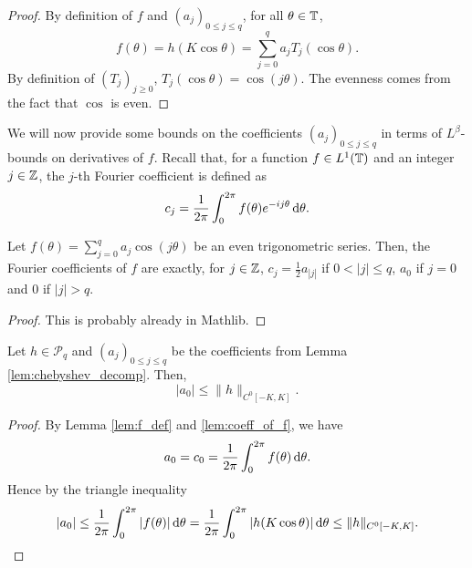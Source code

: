 \begin{proof}
  By definition of $f$ and $(a_j)_{0 \leq j \leq q}$,
  for all $\theta \in \mathbb{T}$,
  \begin{equation*}
    f(\theta) = h(K \cos \theta) = \sum_{j=0}^q a_j T_j(\cos \theta).
  \end{equation*}
  By definition of $(T_j)_{j \geq 0}$, $T_j(\cos \theta) = \cos (j \theta)$.
  The evenness comes from the fact that $\cos$ is even.
\end{proof}

We will now provide some bounds on the coefficients $(a_j)_{0 \leq j \leq q}$
in terms of $L^\beta$-bounds on derivatives of $f$.
Recall that, for a function $f \in L^1(\mathbb{T})$ and an integer $j \in \mathbb{Z}$,
the $j$-th Fourier coefficient is defined as
\begin{equation*}
  c_j = \frac{1}{2 \pi} \int_0^{2 \pi} f(\theta) e^{-i j \theta} \, \mathrm{d} \theta.
\end{equation*}

\begin{lemma}
  \label{lem:coeff_of_f}
  Let $f(\theta) = \sum_{j=0}^q a_j \cos(j \theta)$ be an even trigonometric series.
  Then, the Fourier coefficients of $f$ are exactly, for $j \in \mathbb{Z}$,
  $c_j = \frac{1}{2} a_{|j|}$ if $0 < |j| \leq q$, $a_0$ if $j=0$ and $0$ if $|j|>q$.
\end{lemma}

\begin{proof}
  This is probably already in Mathlib.
\end{proof}


\begin{lemma}
  \label{lem:bound_a0}
  Let $h \in \mathcal{P}_q$ and $(a_j)_{0 \leq j \leq q}$ be the coefficients from Lemma
  \ref{lem:chebyshev_decomp}.
  Then,
  \begin{equation*}
    |a_0| \leq \| h \|_{C^0[-K,K]}.
  \end{equation*}
\end{lemma}

\begin{proof}
  By Lemma \ref{lem:f_def} and \ref{lem:coeff_of_f}, we have
  \begin{equation*}
    a_0 = c_0 = \frac{1}{2 \pi} \int_0^{2 \pi} f(\theta) \, \mathrm{d} \theta.
  \end{equation*}
  Hence by the triangle inequality
  \begin{equation*}
    |a_0| \leq \frac{1}{2 \pi} \int_0^{2 \pi} |f(\theta)| \, \mathrm{d} \theta
    = \frac{1}{2 \pi} \int_0^{2 \pi} |h(K \cos \theta)| \, \mathrm{d} \theta
    \leq \| h \|_{C^0[-K,K]}.
  \end{equation*}
\end{proof}

